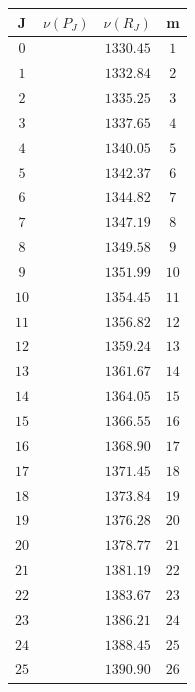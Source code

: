 \documentclass[14pt]{extarticle}
\newcommand{\lb}{\left(}
\newcommand{\rb}{\right)}
\begin{document}
\begin{table}[t]
\begin{minipage}{0.3\linewidth}
		\begin{tabular}{|c|c|c|c|}
			\hline 
			J & $\nu \lb P_J \rb$ & $\nu \lb R_J \rb$ & m \\
			\hline
			$0$ & & $1330.45$ & $1$ \\
			$1$ & & $1332.84$ & $2$ \\
			$2$ & & $1335.25$ & $3$ \\
			$3$ & & $1337.65$ & $4$ \\
			$4$ & & $1340.05$ & $5$ \\
			$5$ & & $1342.37$ & $6$ \\
			$6$ & & $1344.82$ & $7$ \\
			$7$ & & $1347.19$ & $8$ \\
			$8$ & & $1349.58$ & $9$ \\
			$9$ & & $1351.99$ & $10$ \\
			$10$ & & $1354.45$ & $11$ \\
			$11$ & & $1356.82$ & $12$ \\
			$12$ & & $1359.24$ & $13$ \\
			$13$ & & $1361.67$ & $14$ \\
			$14$ & & $1364.05$ & $15$ \\
			$15$ & & $1366.55$ & $16$ \\
			$16$ & & $1368.90$ & $17$ \\
			$17$ & & $1371.45$ & $18$ \\
			$18$ & & $1373.84$ & $19$ \\
			$19$ & & $1376.28$ & $20$ \\
			$20$ & & $1378.77$ & $21$ \\
			$21$ & & $1381.19$ & $22$ \\
			$22$ & & $1383.67$ & $23$ \\
			$23$ & & $1386.21$ & $24$ \\
			$24$ & & $1388.45$ & $25$ \\
			$25$ & & $1390.90$ & $26$ \\ 		
			\hline
		\end{tabular}
	\end{minipage}
\end{table}
\end{document}
